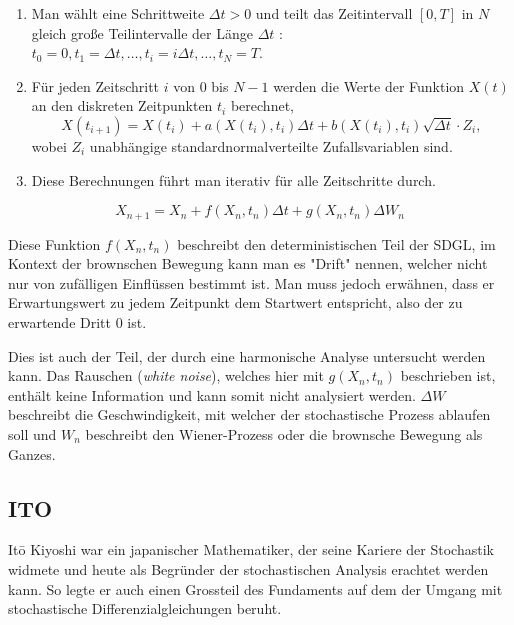 \begin{enumerate}
	\item Man wählt eine Schrittweite $ \Delta t > 0 $ und teilt das Zeitintervall $ [0, T] $ in $ N $ gleich große Teilintervalle der Länge $ \Delta t$ : $ t_0 = 0, t_1 = \Delta t, \dots, t_i = i\Delta t, \dots, t_N = T $.
	\item Für jeden Zeitschritt $ i $ von $ 0 $ bis $ N-1 $ werden die Werte der Funktion $ X(t) $ an den diskreten Zeitpunkten $ t_i $ berechnet,
	\begin{equation}
		X(t_{i+1}) = X(t_i) + a(X(t_i), t_i) \Delta t + b(X(t_i), t_i) \sqrt{\Delta t} \cdot Z_i,
	\end{equation}
	wobei $ Z_i $ unabhängige standardnormalverteilte Zufallsvariablen sind.
	\item Diese Berechnungen führt man iterativ für alle Zeitschritte durch.
\end{enumerate}

\begin{equation}
	X_{n+1} = X_n + f(X_n,t_n) \Delta t + g(X_n,t_n) \Delta W_n
\end{equation}

Diese Funktion $ f(X_n,t_n) $ beschreibt den deterministischen Teil der SDGL, im Kontext der brownschen Bewegung kann man es "Drift" nennen, welcher nicht nur von zufälligen Einflüssen bestimmt ist. Man muss jedoch erwähnen, dass er Erwartungswert zu jedem Zeitpunkt dem Startwert entspricht, also der zu erwartende Dritt 0 ist. 


Dies ist auch der Teil, der durch eine harmonische Analyse untersucht werden kann. Das Rauschen (\textit{white noise}), welches hier mit $ g(X_n,t_n) $ beschrieben ist, enthält keine Information und kann somit nicht analysiert werden. $ \Delta W $ beschreibt die Geschwindigkeit, mit welcher der stochastische Prozess ablaufen soll und $ W_n $  beschreibt den Wiener-Prozess oder die brownsche Bewegung als Ganzes.



\subsection{ITO\label{brown:ito}}

Itō Kiyoshi war ein japanischer Mathematiker, der seine Kariere der Stochastik widmete und heute als Begründer der stochastischen Analysis erachtet werden kann. So legte er auch einen Grossteil des Fundaments auf dem der Umgang mit stochastische Differenzialgleichungen beruht. 

